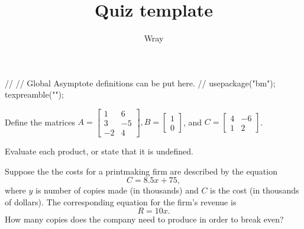 \documentclass[addpoints, 12pt]{exam}
\title{Quiz template}
\author{Wray}
\begin{document}
\begin{asydef}
//
// Global Asymptote definitions can be put here.
//
usepackage("bm");
texpreamble("\def\V#1{\bm{#1}}");
\end{asydef}

\bigskip

             
\bigskip
\bigskip

\smallskip

\begin{questions}

\question[10]
Define the matrices 
$A = \left[ \begin{array} {cc}
1 & 6 \\
3 & -5 \\
-2 & 4
\end{array} \right], 
B = \left[ \begin{array} {cc}
1 \\
0
\end{array} \right]$, and
$C = \left[ \begin{array} {cc}
4 & -6 \\
1 & 2
\end{array} \right]$.

Evaluate each product, or state that it is undefined.
\newpage

\question[10]
Suppose the the costs for a printmaking firm are described by the equation
\begin{equation*}
C = 8.5x + 75,
\end{equation*}
where $y$ is number of copies made (in thousands) and $C$ is the cost (in thousands of dollars).  The corresponding equation for the firm's revenue is
\begin{equation*}
R = 10x.
\end{equation*}
How many copies does the company need to produce in order to break even?

\end{questions}
\end{document}
